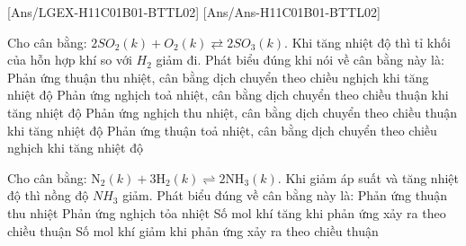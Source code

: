 [Ans/LGEX-H11C01B01-BTTL02]
[Ans/Ans-H11C01B01-BTTL02]
\begin{ex}
	Cho cân bằng: $2SO_2(k)+O_2(k) \rightleftarrows 2SO_3(k)$. Khi tăng nhiệt độ thì tỉ khối của hỗn hợp khí so với $H_2$ giảm đi. Phát biểu đúng khi nói về cân bằng này là:
	\choice
	{Phản ứng thuận thu nhiệt, cân bằng dịch chuyển theo chiều nghịch khi tăng nhiệt độ}
	{Phản ứng nghịch toả nhiệt, cân bằng dịch chuyển theo chiều thuận khi tăng nhiệt độ}
	{Phản ứng nghịch thu nhiệt, cân bằng dịch chuyển theo chiều thuận khi tăng nhiệt độ}
	{Phản ứng thuận toả nhiệt, cân bằng dịch chuyển theo chiều nghịch khi tăng nhiệt độ}
\end{ex}
\begin{ex}
	Cho cân bằng: $\text{N}_2(k) + 3\text{H}_2(k) \rightleftharpoons 2\text{NH}_3(k)$. Khi giảm áp suất và tăng nhiệt độ thì nồng độ $NH_3$ giảm. Phát biểu đúng về cân bằng này là:
	\choice
	{Phản ứng thuận thu nhiệt}
	{Phản ứng nghịch tỏa nhiệt}
	{Số mol khí tăng khi phản ứng xảy ra theo chiều thuận}
	{\True Số mol khí giảm khi phản ứng xảy ra theo chiều thuận}
\end{ex}

